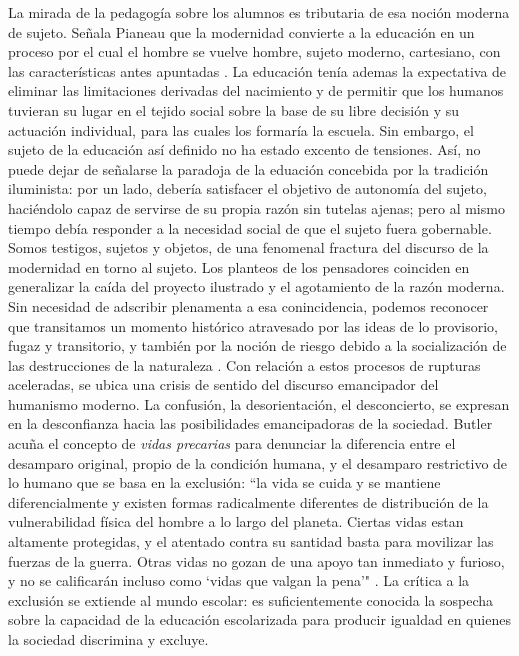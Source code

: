 \documentclass[a4paper,12pt,spanish]{book}
\begin{document}
La mirada de la pedagogía sobre los alumnos es tributaria de esa noción moderna de sujeto. Señala Pianeau que 
la modernidad convierte a la educación en un proceso por el cual el hombre se vuelve hombre, sujeto moderno,
cartesiano, con las características antes apuntadas \citep{pineau1999}. La educación tenía ademas la expectativa de eliminar
las limitaciones derivadas del nacimiento y de permitir que los humanos tuvieran su lugar en el tejido social sobre 
la base de su libre decisión y su actuación individual, para las cuales los formaría la escuela.
Sin embargo, el sujeto de la educación así definido no ha estado excento de tensiones. Así, no puede dejar de 
señalarse la paradoja de la eduación concebida por la tradición iluminista: por un lado, debería satisfacer el objetivo
 de autonomía del sujeto, haciéndolo capaz de servirse de su propia razón sin tutelas ajenas; pero al mismo tiempo debía 
 responder a la necesidad social de que el sujeto fuera gobernable\citep{cerletti2008}.
 Somos testigos, sujetos y objetos, de una fenomenal fractura del discurso de la modernidad en torno al sujeto. Los 
 planteos de los pensadores coinciden en generalizar la caída del proyecto ilustrado y el agotamiento de la razón moderna. Sin 
 necesidad de adscribir plenamenta a esa conincidencia, podemos reconocer que transitamos un momento histórico atravesado por 
 las ideas de lo provisorio, fugaz y transitorio, y también por la noción de riesgo debido a la socialización de las destrucciones
  de la naturaleza \citep{beck2006}. Con relación a estos procesos de rupturas aceleradas, se ubica una crisis de sentido del 
  discurso emancipador del humanismo moderno. La confusión, la desorientación, el desconcierto, se expresan en la desconfianza hacia 
  las posibilidades emancipadoras de la sociedad. Butler acuña el concepto de \textit{vidas precarias} para denunciar la diferencia 
  entre el desamparo original, propio de la condición humana, y el desamparo restrictivo de lo humano que se basa en la exclusión: 
  ``la vida se cuida y se mantiene diferencialmente y existen formas radicalmente diferentes de distribución de la vulnerabilidad
  física del hombre a lo largo del planeta. Ciertas vidas estan altamente protegidas, y el atentado contra su santidad basta para movilizar
  las fuerzas de la guerra. Otras vidas no gozan de una apoyo tan inmediato y furioso, y no se calificarán 
  incluso como `vidas que valgan la pena'" \citep{butler2006}. La crítica a la exclusión se extiende al mundo escolar: es suficientemente 
  conocida la sospecha sobre la capacidad de la educación escolarizada para producir igualdad en quienes la sociedad discrimina y excluye.
\end{document}
